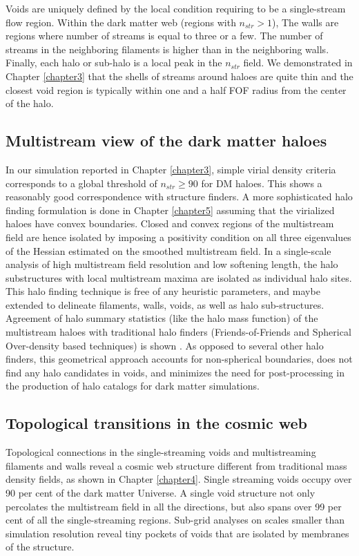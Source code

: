 Voids are uniquely defined by the local condition requiring to be a single-stream flow region. Within the dark matter web (regions with $n_{str} > 1$), The walls are regions where number of streams is equal to three or a few. The number of streams in the neighboring filaments is higher than in the neighboring walls. Finally, each halo or sub-halo is a local peak in the $n_{str}$ field. We demonstrated in Chapter \ref{chapter3} that the shells of streams around haloes are quite thin and the closest void region is typically within one and a half FOF radius from the center of the halo.

\subsection{Multistream view of the dark matter haloes}

In our simulation reported in Chapter \ref{chapter3}, simple virial density criteria corresponds to a global threshold of $n_{str} \geq 90$ for DM haloes. This shows a reasonably good correspondence with structure finders. A more sophisticated halo finding formulation is done in Chapter \ref{chapter5} assuming that the virialized haloes have convex boundaries. Closed and convex regions of the multistream field are hence isolated by imposing a positivity condition on all three eigenvalues of the Hessian estimated on the smoothed multistream field. In a single-scale analysis of high multistream field resolution and low softening length, the halo substructures with local multistream maxima are isolated as individual halo sites. This halo finding technique is free of any heuristic parameters, and maybe extended to delineate filaments, walls, voids, as well as halo sub-structures. Agreement of halo summary statistics (like the halo mass function) of the multistream haloes with traditional halo finders (Friends-of-Friends and Spherical Over-density based techniques) is shown \cite{Ramachandra2017b}. As opposed to several other halo finders, this geometrical approach accounts for non-spherical boundaries, does not find any halo candidates in voids, and minimizes the need for post-processing in the production of halo catalogs for dark matter simulations.   

\subsection{Topological transitions in the cosmic web}

Topological connections in the single-streaming voids and multistreaming filaments and walls reveal a cosmic web structure different from traditional mass density fields, as shown in Chapter \ref{chapter4}. Single streaming voids occupy over 90 per cent of the dark matter Universe. A single void structure not only percolates the multistream field in all the directions, but also spans over 99 per cent of all the single-streaming regions. Sub-grid analyses on scales smaller than simulation resolution reveal tiny pockets of voids that are isolated by membranes of the structure. 


